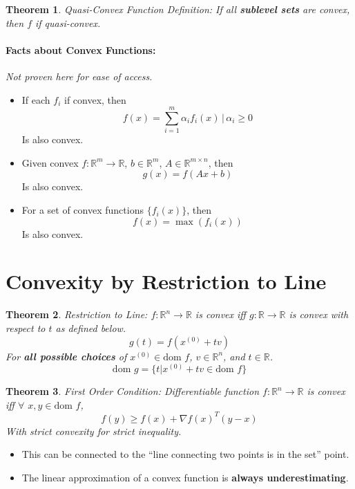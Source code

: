 \documentclass[a4paper,12pt]{report}
\def\reals{\mathbb{R}}
\newtheorem{theorem}{Theorem}
\begin{document}
\begin{theorem}{Quasi-Convex Function Definition: }
If all \textbf{sublevel sets} are convex, then $f$ if quasi-convex.
\end{theorem}


\paragraph{Facts about Convex Functions: } \textit{Not proven here for ease of access.} 
\begin{itemize}
\item If each $f_i$ if convex, then 
\begin{equation}
f(x) = \sum_{i=1}^{m} \alpha_i f_i(x)\, | \, \alpha_i \geq 0
\end{equation}
Is also convex.

\item Given convex $f:\mathbb R^m \to \mathbb R$, $b\in \mathbb R^m$, $A\in \mathbb R^{m\times n}$, then 
\begin{equation}
g(x) = f(Ax + b)
\end{equation}
Is also convex. 

\item For a set of convex functions $\{f_i(x)\}$, then 
\begin{equation}
f(x) = \max(f_i(x))
\end{equation}
Is also convex.
\end{itemize}


\section{Convexity by Restriction to Line}

\begin{theorem}{Restriction to Line: }
$f:\reals^n \to \reals$ is convex iff $g:\reals \to \reals$ is convex with respect to $t$ as defined below.
\begin{equation}
g(t) = f(x^{(0)} + tv)
\end{equation}
For \textbf{all possible choices} of $x^{(0)} \in \text{dom }f$, $v\in \reals^n$, and $t\in \reals$.
\begin{equation}
\text{dom }g = \{t | x^{(0)} +tv \in \text{dom }f \}
\end{equation}
\end{theorem}


\begin{theorem}{First Order Condition: }
Differentiable function $f:\reals^n\to \reals$ is convex iff $\forall$ $x,y\in \text{dom }f$,
\begin{equation}
f(y) \geq f(x) + \nabla f(x)^T (y-x)
\end{equation}
With strict convexity for strict inequality.
\end{theorem}
\begin{itemize}
\item This can be connected to the ``line connecting two points is in the set'' point.
\item The linear approximation of a convex function is \textbf{always underestimating}.
\end{itemize}
\end{document}
